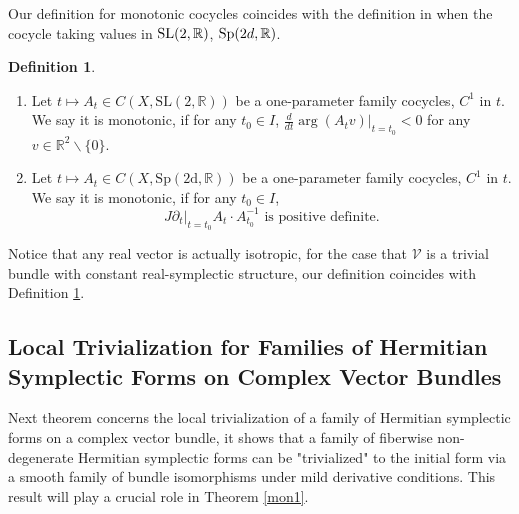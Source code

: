 \documentclass[11pt]{amsart}
\theoremstyle{remark}
\theoremstyle{definition}
\newtheorem{definition}{Definition}
\newcommand{\R}{{\mathbf R}}
\newcommand{\V}{{\mathbf V}}
\newcommand{\SL}{{\rm SL}}
\newcommand{\Sp}{{\rm Sp}}
\def \V{\mathcal{V}}
\def\R{{\mathbb R}}
\begin{document}
Our definition for monotonic cocycles coincides with the definition in \cite{AK, Xu} when the cocycle taking values in $\SL(2,\R)$, $\Sp(2d,\R)$.
\begin{definition}\cite{AK, Xu}\label{olddef}
\begin{enumerate}
\item Let $t\mapsto A_t\in C(X,\mathrm{SL(2,\R)})$ be a one-parameter family cocycles, $C^1$ in $t$. We say it is monotonic, 
if for any $t_0\in I$, $\frac{d}{dt}\arg(A_tv)|_{t=t_0}<0$ for any $v\in\R^2\backslash\{0\}.$
\item Let $t\mapsto A_t\in C(X,\mathrm{Sp(2d,\R)}) $  be a one-parameter family cocycles, $C^1$ in $t$. We say it is monotonic, 
if for any $t_0\in I$, $$J\partial_t|_{t=t_0} A_t\cdot A_{t_0}^{-1} \text{ is positive definite}.$$
\end{enumerate}

\end{definition}





Notice that any real vector is actually isotropic, for the case that $\V$ is a trivial bundle with constant real-symplectic structure, our definition coincides with Definition \ref{olddef}.



\subsection{Local Trivialization  for Families of Hermitian Symplectic Forms on Complex Vector Bundles}

Next theorem concerns the local trivialization of a family of Hermitian symplectic forms on a complex vector bundle, it shows that  a family of fiberwise non-degenerate Hermitian symplectic forms can be "trivialized" to the initial form via a smooth family of bundle isomorphisms under mild derivative conditions. This result will play a crucial role in Theorem \ref{mon1}.
\end{document}
